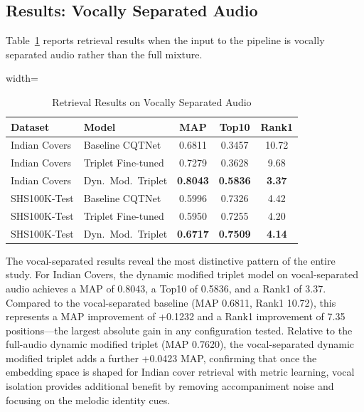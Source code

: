 \documentclass[conference]{IEEEtran}
\begin{document}
\subsection{Results: Vocally Separated Audio}

Table~\ref{tab:vocal_sep} reports retrieval results when the input to the pipeline is vocally separated audio rather than the full mixture.

\begin{table}[htbp]
    \caption{Retrieval Results on Vocally Separated Audio}
    \label{tab:vocal_sep}
    \centering
    \begin{adjustbox}{width=\columnwidth}
    \begin{tabular}{llccc}
    \toprule
    \textbf{Dataset} & \textbf{Model} & \textbf{MAP} & \textbf{Top10} & \textbf{Rank1} \\
    \midrule
    Indian Covers & Baseline CQTNet & 0.6811 & 0.3457 & 10.72 \\
    Indian Covers & Triplet Fine-tuned & 0.7279 & 0.3628 & 9.68 \\
    Indian Covers & Dyn.\ Mod.\ Triplet & \textbf{0.8043} & \textbf{0.5836} & \textbf{3.37} \\
    \midrule
    SHS100K-Test  & Baseline CQTNet & 0.5996 & 0.7326 & 4.42 \\
    SHS100K-Test  & Triplet Fine-tuned & 0.5950 & 0.7255 & 4.20 \\
    SHS100K-Test  & Dyn.\ Mod.\ Triplet & \textbf{0.6717} & \textbf{0.7509} & \textbf{4.14} \\
    \bottomrule
    \end{tabular}
    \end{adjustbox}
\end{table}

The vocal-separated results reveal the most distinctive pattern of the entire study. For Indian Covers, the dynamic modified triplet model on vocal-separated audio achieves a MAP of 0.8043, a Top10 of 0.5836, and a Rank1 of 3.37. Compared to the vocal-separated baseline (MAP 0.6811, Rank1 10.72), this represents a MAP improvement of +0.1232 and a Rank1 improvement of 7.35 positions—the largest absolute gain in any configuration tested. Relative to the full-audio dynamic modified triplet (MAP 0.7620), the vocal-separated dynamic modified triplet adds a further +0.0423 MAP, confirming that once the embedding space is shaped for Indian cover retrieval with metric learning, vocal isolation provides additional benefit by removing accompaniment noise and focusing on the melodic identity cues.
\end{document}
